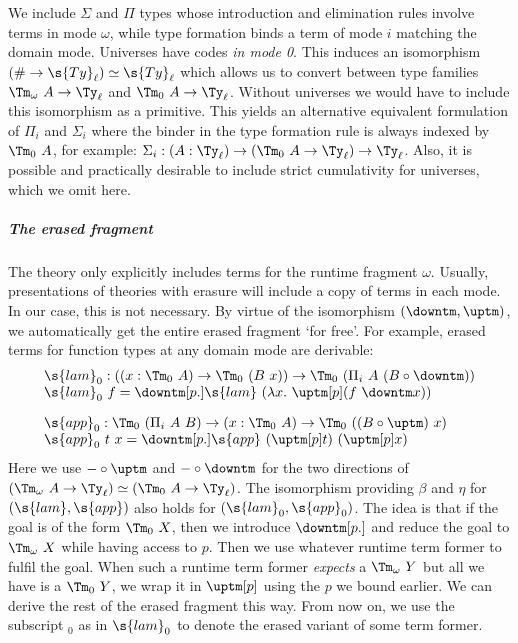 We include $\Sigma$ and $\Pi$ types whose introduction and elimination rules
involve terms in mode $\omega$, while type formation binds a term of mode $i$
matching the domain mode. Universes have codes \emph{in mode 0}. This induces an
isomorphism $(\# \to \s{Ty}_\ell) \simeq \s{Ty}_\ell$ which allows us to convert
between type families $\Tm_\omega\ A \to \Ty_\ell$ and $\Tm_0\ A \to \Ty_\ell$.
Without universes we would have to include this isomorphism as a primitive. This
yields an alternative equivalent formulation of $\Pi_i$ and $\Sigma_i$ 
where the binder in the type formation rule is always indexed by $\Tm_0\ A$, for
example: $\Sigma_i : (A : \Ty_\ell) \to (\Tm_0\ A \to \Ty_\ell) \to \Ty_\ell$.
Also, it is possible and practically desirable to include strict cumulativity
\cite{Sterling2019-ze} for universes, which we omit here.

\subparagraph{The erased fragment}\label{ssub:erased}


The theory only explicitly includes terms for the runtime fragment
$\omega$. Usually, presentations of theories with erasure will include
a copy of terms in each mode. In our case, this is not necessary. By virtue
of the isomorphism $(\downtm, \uptm)$, we automatically get the entire erased
fragment `for free'.
For example, erased terms for function types at any domain mode are derivable:
\[
\begin{array}{l}
  \s{lam}_0 : ((x : \Tm_0\ A) \to \Tm_0\ (B\ x)) \to \Tm_0\ (\Pi_i\ A\ (B \circ \downtm)) \\
  \s{lam}_0\ f = {\downtm[p.] \s{lam}\ (\lambda x.\ \uptm[p] (f\ \downtm x))} \\[1em]
  \s{app}_0 : \Tm_0\ (\Pi_i\ A\ B) \to (x : \Tm_0\ A) \to \Tm_0\ ((B \circ \uptm)\ x)  \\
  \s{app}_0\ t\ x = {\downtm[p.] \s{app}\ (\uptm[p] t)\ (\uptm[p] x)}
\end{array}\]
Here we use $- \circ \uptm$ and $- \circ \downtm$ for the two directions
of $(\Tm_\omega\ A \to \Ty_\ell) \simeq (\Tm_0\ A \to \Ty_\ell)$.
The isomorphism providing $\beta$ and $\eta$ for $(\s{lam},
\s{app})$ also holds for $(\s{lam}_0, \s{app}_0)$. The idea is that if the goal
is of the form $\Tm_0\ X$, then we introduce $\downtm[p.]$ and reduce the goal
to $\Tm_\omega\ X$ while having access to $p$. Then we use whatever runtime term
former to fulfil the goal. When such a runtime term former \emph{expects} a
$\Tm_\omega\ Y$  but all we have is a $\Tm_0\ Y$, we wrap it in $\uptm[p]$ using
the $p$ we bound earlier. We can derive the rest of the erased fragment this
way. From now on, we use the subscript $_0$ as in $\s{lam}_0$ to denote the
erased variant of some term former.

